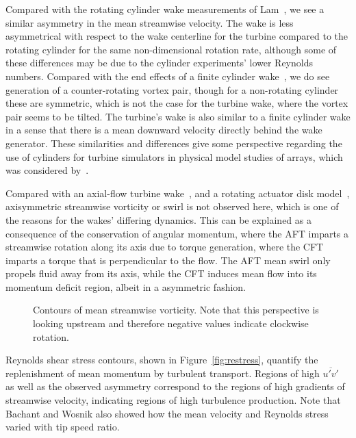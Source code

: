 Compared with the rotating cylinder wake measurements of Lam~\cite{Lam2009}, we
see a similar asymmetry in the mean streamwise velocity. The wake is less
asymmetrical with respect to the wake centerline for the turbine compared to the
rotating cylinder for the same non-dimensional rotation rate, although some of
these differences may be due to the cylinder experiments' lower Reynolds
numbers. Compared with the end effects of a finite cylinder
wake~\cite{Sumner2004}, we do see generation of a counter-rotating vortex pair,
though for a non-rotating cylinder these are symmetric, which is not the case
for the turbine wake, where the vortex pair seems to be tilted. The turbine's
wake is also similar to a finite cylinder wake in a sense that there is a mean
downward velocity directly behind the wake generator. These similarities and
differences give some perspective regarding the use of cylinders for turbine
simulators in physical model studies of arrays, which was considered
by~\cite{Pierce2013}.

Compared with an axial-flow turbine wake~\cite{Cal2010}, and a rotating actuator
disk model~\cite{Wu2011}, axisymmetric streamwise vorticity or swirl is not
observed here, which is one of the reasons for the wakes' differing dynamics.
This can be explained as a consequence of the conservation of angular momentum,
where the AFT imparts a streamwise rotation along its axis due to torque
generation, where the CFT imparts a torque that is perpendicular to the flow.
The AFT mean swirl only propels fluid away from its axis, while the CFT induces
mean flow into its momentum deficit region, albeit in a asymmetric fashion.

\begin{figure}
    \centering
    

    \caption{Contours of mean streamwise vorticity. Note that this perspective
        is looking upstream and therefore negative values indicate clockwise
        rotation.}
    
    \label{fig:xvorticity}
\end{figure}

Reynolds shear stress contours, shown in Figure~\ref{fig:restress}, quantify the
replenishment of mean momentum by turbulent transport. Regions of high
$\overline{u'v'}$ as well as the observed asymmetry correspond to the regions of
high gradients of streamwise velocity, indicating regions of high turbulence
production. Note that Bachant and Wosnik \cite{Bachant2013} also showed how the
mean velocity and Reynolds stress varied with tip speed ratio.

